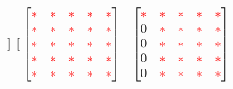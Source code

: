 \begin{frame}
\[\begin{matrix}
\begin{bmatrix}
    \end{bmatrix}
    &
    \begin{bmatrix}
      \ch & \ch & \ch & \ch & \ch \\
      \ch & \ch & \ch & \ch & \ch \\
      \ch & \ch & \ch & \ch & \ch \\
      \ch & \ch & \ch & \ch & \ch \\
      \ch & \ch & \ch & \ch & \ch \\
    \end{bmatrix}
    &
    \begin{bmatrix}
      \ch & \ch & \ch & \ch & \ch \\
      0 & \ch & \ch & \ch & \ch \\
      0 & \ch & \ch & \ch & \ch \\
      0 & \ch & \ch & \ch & \ch \\
      0 & \ch & \ch & \ch & \ch \\
    \end{bmatrix}
  \end{matrix}
  \]
\end{frame}

